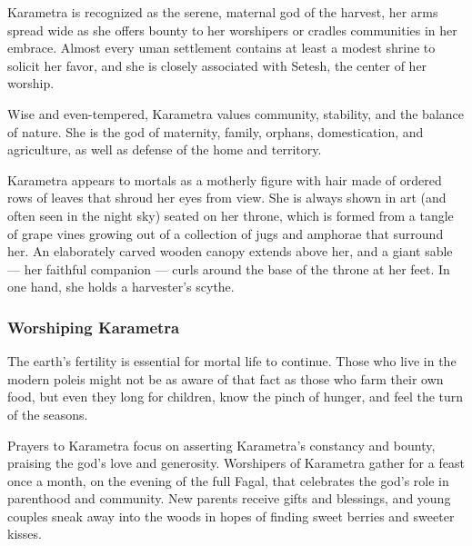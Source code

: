     Karametra is recognized as the serene, maternal god of the harvest, her arms spread wide as she offers bounty to her worshipers or cradles communities in her embrace.
    Almost every uman settlement contains at least a modest shrine to solicit her favor, and she is closely associated with Setesh, the center of her worship.

    Wise and even-tempered, Karametra values community, stability, and the balance of nature.
    She is the god of maternity, family, orphans, domestication, and agriculture, as well as defense of the home and territory.

    Karametra appears to mortals as a motherly figure with hair made of ordered rows of leaves that shroud her eyes from view.
    She is always shown in art (and often seen in the night sky) seated on her throne, which is formed from a tangle of grape vines growing out of a collection of jugs and amphorae that surround her.
    An elaborately carved wooden canopy extends above her, and a giant sable --- her faithful companion --- curls around the base of the throne at her feet.
    In one hand, she holds a harvester's scythe.

    \subsubsection{Worshiping Karametra}
        The earth's fertility is essential for mortal life to continue.
        Those who live in the modern poleis might not be as aware of that fact as those who farm their own food, but even they long for children, know the pinch of hunger, and feel the turn of the seasons.

        Prayers to Karametra focus on asserting Karametra's constancy and bounty, praising the god's love and generosity.
        Worshipers of Karametra gather for a feast once a month, on the evening of the full Fagal, that celebrates the god's role in parenthood and community.
        New parents receive gifts and blessings, and young couples sneak away into the woods in hopes of finding sweet berries and sweeter kisses.
